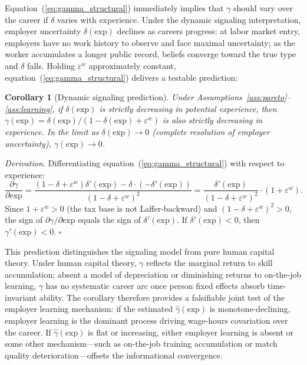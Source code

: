 \documentclass[12pt]{article}
\newtheorem{corollary}{Corollary}[proposition]
\theoremstyle{definition}
\theoremstyle{remark}
\begin{document}
Equation~(\ref{eq:gamma_structural}) immediately implies that $\gamma$ should vary over the
career if $\delta$ varies with experience. Under the dynamic signaling interpretation, employer
uncertainty $\delta(\text{exp})$ declines as careers progress: at labor market entry, employers
have no work history to observe and face maximal uncertainty; as the worker accumulates a
longer public record, beliefs converge toward the true type and $\delta$ falls. Holding
$\varepsilon^w$ approximately constant, equation~(\ref{eq:gamma_structural}) delivers a
testable prediction:

\begin{corollary}[Dynamic signaling prediction]
\label{prop:gamma_arc}
Under Assumptions~\ref{ass:pareto}--\ref{ass:learning}, if $\delta(\text{exp})$ is strictly
decreasing in potential experience, then $\gamma(\text{exp}) = \delta(\text{exp}) /
(1 - \delta(\text{exp}) + \varepsilon^w)$ is also strictly decreasing in experience.
In the limit as $\delta(\text{exp}) \to 0$ (complete resolution of employer uncertainty),
$\gamma(\text{exp}) \to 0$.
\end{corollary}

\noindent \emph{Derivation.} Differentiating equation~(\ref{eq:gamma_structural}) with
respect to experience:
\[
\frac{\partial \gamma}{\partial \text{exp}}
= \frac{(1 - \delta + \varepsilon^w) \delta'(\text{exp}) - \delta \cdot (-\delta'(\text{exp}))}{(1 - \delta + \varepsilon^w)^2}
= \frac{\delta'(\text{exp})}{(1 - \delta + \varepsilon^w)^2} \cdot (1 + \varepsilon^w).
\]
Since $1 + \varepsilon^w > 0$ (the tax base is not Laffer-backward) and $(1 - \delta + \varepsilon^w)^2 > 0$,
the sign of $\partial \gamma / \partial \text{exp}$ equals the sign of $\delta'(\text{exp})$.
If $\delta'(\text{exp}) < 0$, then $\gamma'(\text{exp}) < 0$. $\square$

This prediction distinguishes the signaling model from pure human capital theory. Under
human capital theory, $\gamma$ reflects the marginal return to skill accumulation; absent
a model of depreciation or diminishing returns to on-the-job learning, $\gamma$ has no
systematic career arc once person fixed effects absorb time-invariant ability. The
corollary therefore provides a falsifiable joint test of the employer learning mechanism:
if the estimated $\hat{\gamma}(\text{exp})$ is monotone-declining, employer learning is
the dominant process driving wage-hours covariation over the career. If $\hat{\gamma}(\text{exp})$
is flat or increasing, either employer learning is absent or some other mechanism---such as
on-the-job training accumulation or match quality deterioration---offsets the informational
convergence.
\end{document}
